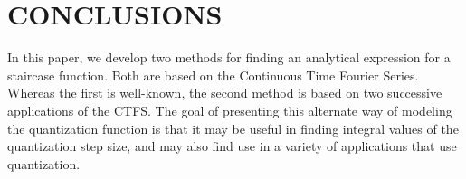 \documentclass[12pt]{article}
\begin{document}
\section{CONCLUSIONS}
In this paper, we develop two methods for finding an analytical expression for a staircase function.  Both are based on the Continuous Time Fourier Series.  Whereas the first is well-known, the second method is based on two successive applications of the CTFS.  The goal of presenting this alternate way of modeling the quantization function is that it may be useful in finding integral values of the quantization step size, and may also find use in a variety of applications that use quantization.


  
\end{document}
